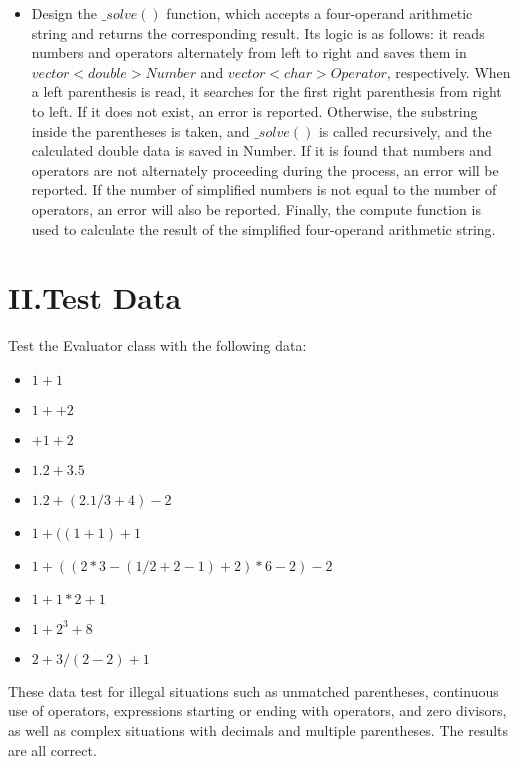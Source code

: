 \documentclass[a4paper]{article}
\begin{document}
\begin{itemize}
\item Design the $\_solve()$ function, which accepts a four-operand arithmetic string and returns the corresponding result. Its logic is as follows: it reads numbers and operators alternately from left to right and saves them in $vector<double> Number$ and $vector<char> Operator$, respectively. When a left parenthesis is read, it searches for the first right parenthesis from right to left. If it does not exist, an error is reported. Otherwise, the substring inside the parentheses is taken, and $\_solve()$ is called recursively, and the calculated double data is saved in Number. If it is found that numbers and operators are not alternately proceeding during the process, an error will be reported. If the number of simplified numbers is not equal to the number of operators, an error will also be reported. Finally, the compute function is used to calculate the result of the simplified four-operand arithmetic string.

\end{itemize}

\section*{II.Test Data}
Test the Evaluator class with the following data:

\begin{itemize}
\item $1+1$
\item $1++2$
\item $+1+2$
\item $1.2+3.5$
\item $1.2+(2.1/3+4)-2$
\item $1+((1+1)+1$
\item $1+((2*3-(1/2+2-1)+2)*6-2)-2$
\item $1+1*2+1$
\item $1+2^{3}+8$
\item $2+3/(2-2)+1$
\end{itemize}

These data test for illegal situations such as unmatched parentheses, continuous use of operators, expressions starting or ending with operators, and zero divisors, as well as complex situations with decimals and multiple parentheses. The results are all correct.
\end{document}
